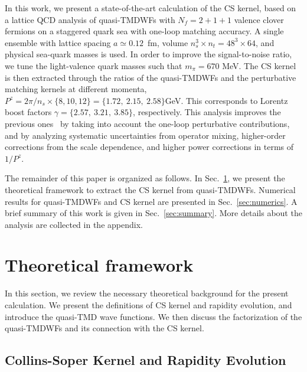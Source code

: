 \documentclass[prd,aps,twocolumn,preprintnumbers, showpacs, nofootinbib,superscriptaddress,notitlepage]{revtex4-1}
\begin{document}
In this work, we present a state-of-the-art calculation of the CS kernel, based on a lattice QCD analysis of quasi-TMDWFs with $N_f=2+1+1$ valence clover fermions on a staggered quark sea with one-loop matching accuracy. A single ensemble with lattice spacing $a\simeq0.12$~fm,  volume $n_s^3\times n_t=48^3\times64$, and  physical sea-quark masses is used. In order to improve the signal-to-noise ratio, we tune the light-valence quark masses such that $m_\pi = 670$ MeV. The CS  kernel is then extracted through the ratios of the quasi-TMDWFs and the perturbative matching kernels at different momenta, $P^z=2\pi/n_s\times\{8,10,12\}=\{1.72,~2.15,~2.58\}$GeV. This  corresponds to Lorentz boost factors  $\gamma=\{2.57,~3.21,~3.85\}$, respectively. This analysis improves the previous ones~\cite{LatticeParton:2020uhz,Li:2021wvl} by taking into account  the one-loop perturbative contributions, and by analyzing  systematic uncertainties from operator mixing,  higher-order corrections from the scale dependence, and higher power corrections in terms of $1/P^z$.  
 
The remainder of this paper is organized as follows. 
In Sec.~\ref{sec:framework}, we present the theoretical framework to extract the CS kernel from  quasi-TMDWFs. Numerical results for quasi-TMDWFs and CS kernel are presented in Sec.~\ref{sec:numerics}. A brief  summary of this work is given in Sec.~\ref{sec:summary}.  More details about the analysis are collected in the appendix. 



  
\section{Theoretical framework}
\label{sec:framework}
 
In this section, we review the necessary theoretical background
for the present calculation. We present the definitions of
CS kernel and rapidity evolution, and introduce the quasi-TMD wave functions. We then discuss the factorization of the quasi-TMDWFs
and its connection with the CS kernel. 
   
\subsection{Collins-Soper Kernel and Rapidity Evolution}
\end{document}
